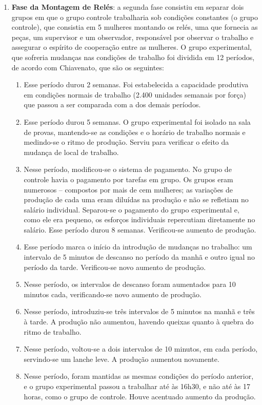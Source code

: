 \begin{enumerate}
	\item \textbf{Fase da Montagem de Relés}: a segunda fase consistiu em separar dois grupos em que o grupo controle trabalharia sob condições constantes (o grupo controle), que consistia em 5 mulheres montando os relés, uma que fornecia as peças, um supervisor e um observador, responsável por observar o trabalho e assegurar o espírito de cooperação entre as mulheres. O grupo experimental, que sofreria mudanças nas condições de trabalho foi dividida em 12 períodos, de acordo com Chiavenato, que são os seguintes:
		\begin{enumerate}
			\item Esse período durou 2 semanas. Foi estabelecida a capacidade produtiva em condições normais de trabalho (2.400 unidades semanais por força) que passou a ser comparada com a dos demais períodos.
			\item Esse período durou 5 semanas. O grupo experimental foi isolado na sala de provas, mantendo-se as condições e o horário de trabalho normais e medindo-se o ritmo de produção. Serviu para verificar o efeito da mudança de local de trabalho.
			\item Nesse período, modificou-se o sistema de pagamento. No grupo de controle havia o pagamento por tarefas em grupo. Os grupos eram numerosos – compostos por mais de cem mulheres; as variações de produção de cada uma eram diluídas na produção e não se refletiam no salário individual. Separou-se o pagamento do grupo experimental e, como ele era pequeno, os esforços individuais
			repercutiam diretamente no salário. Esse período durou 8 semanas. Verificou-se aumento de produção.
			\item Esse período marca o início da introdução de mudanças no trabalho: um intervalo de 5 minutos de descanso no período da manhã e outro igual no período da tarde. Verificou-se novo aumento de	produção.
			\item Nesse período, os intervalos de descanso foram aumentados para 10 minutos cada, verificando-se novo aumento de produção.
			\item Nesse período, introduziu-se três intervalos de 5 minutos na manhã e três à tarde. A produção não	aumentou, havendo queixas quanto à quebra do ritmo de trabalho.
			\item Nesse período, voltou-se a dois intervalos de 10 minutos, em cada período, servindo-se um lanche leve. A produção aumentou novamente.
			\item Nesse período, foram mantidas as mesmas condições do período anterior, e o grupo experimental passou a trabalhar até às 16h30, e não até às 17 horas, como o grupo de controle. Houve acentuado aumento da produção.

\end{enumerate}
\end{enumerate}
